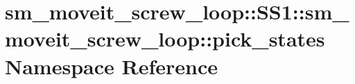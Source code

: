 \hypertarget{namespacesm__moveit__screw__loop_1_1SS1_1_1sm__moveit__screw__loop_1_1pick__states}{}\section{sm\+\_\+moveit\+\_\+screw\+\_\+loop\+:\+:S\+S1\+:\+:sm\+\_\+moveit\+\_\+screw\+\_\+loop\+:\+:pick\+\_\+states Namespace Reference}
\label{namespacesm__moveit__screw__loop_1_1SS1_1_1sm__moveit__screw__loop_1_1pick__states}
